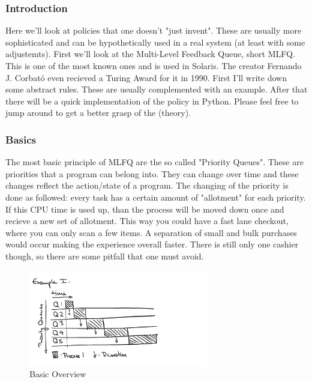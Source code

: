 \documentclass{report}
\begin{document}
\subsubsection{Introduction}
Here we'll look at policies that one doesn't "just invent".
These are usually more sophisticated and can be hypothetically used in a real system (at least with some adjustemts). 
First we'll look at the Multi-Level Feedback Queue, short MLFQ. 
This is one of the most known ones and is used in Solaris.
The creator Fernando J. Corbató even recieved a Turing Award for it in 1990.
First I'll write down some abstract rules. These are usually complemented with an example. 
After that there will be a quick implementation of the policy in Python.
Please feel free to jump around to get a better grasp of the (theory).

\subsubsection{Basics}

The most basic principle of MLFQ are the so called "Priority Queues". These are priorities that a program can belong into.
They can change over time and these changes reflect the action/state of a program.
The changing of the priority is done as followed: every task has a certain amount of "allotment" for each priority.
If this CPU time is used up, than the process will be moved down once and recieve a new set of allotment.
This way you could have a fast lane checkout, where you can only scan a few items.
A separation of small and bulk purchases would occur making the experience overall faster.
There is still only one cashier though, so there are some pitfall that one must avoid.

\begin{figure}[h]
  \begin{center}
    \includegraphics[width=0.7\textwidth]{assets/mlfq-diag-1.png}
    \caption{Basic Overview}
    \label{mlfq-diag-1}
  \end{center}
\end{figure}
\end{document}
